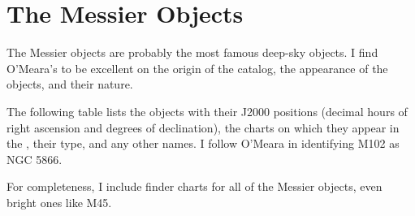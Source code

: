 
\chapter{The Messier Objects}

The Messier objects are probably the most famous deep-sky objects. I find O’Meara’s  to be excellent  on the origin of the catalog, the appearance of the objects, and their nature.

The following table lists the objects with their J2000 positions (decimal hours of right ascension and degrees of declination), the charts on which they appear in the {\PSA}, their type, and any other names. I follow O’Meara in identifying M102 as NGC 5866.

For completeness, I include finder charts for all of the Messier objects, even bright ones like M45.


\clearpage

